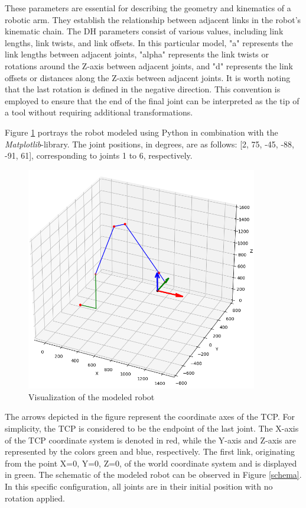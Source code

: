 These parameters are essential for describing the geometry and kinematics of a robotic arm. They establish the relationship between adjacent links in the robot's kinematic chain. The \acrshort{DH} parameters consist of various values, including link lengths, link twists, and link offsets. In this particular model, "a" represents the link lengths between adjacent joints, "alpha" represents the link twists or rotations around the Z-axis between adjacent joints, and "d" represents the link offsets or distances along the Z-axis between adjacent joints.
It is worth noting that the last rotation is defined in the negative direction. This convention is employed to ensure that the end of the final joint can be interpreted as the tip of a tool without requiring additional transformations.

Figure \ref{robotprog} portrays the robot modeled using Python in combination with the \textit{Matplotlib}-library. The joint positions, in degrees, are as follows: [2, 75, -45, -88, -91, 61], corresponding to joints 1 to 6, respectively.

 \begin{figure}[H]
	\centerline{\includegraphics[width=0.9\textwidth]{figures/robotprog.png}}
	\caption{Visualization of the modeled robot}
	\label{robotprog}
\end{figure}


The arrows depicted in the figure represent the coordinate axes of the \acrshort{TCP}. For simplicity, the \acrshort{TCP} is considered to be the endpoint of the last joint. The X-axis of the \acrshort{TCP} coordinate system is denoted in red, while the Y-axis and Z-axis are represented by the colors green and blue, respectively. The first link, originating from the point X=0, Y=0, Z=0, of the world coordinate system and is displayed in green.
\newpage
The schematic of the modeled robot can be observed in Figure \ref{schema}. In this specific configuration, all joints are in their initial position with no rotation applied.


